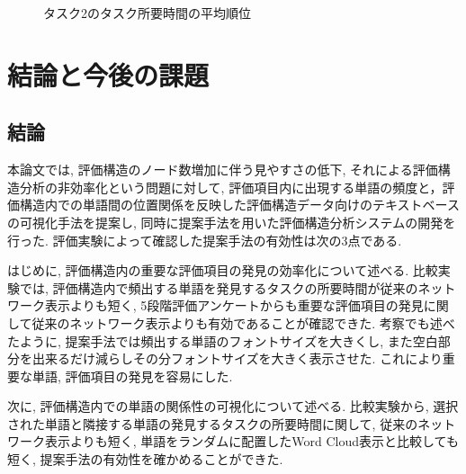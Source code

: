 \documentclass[syuuron]{kuee}
\begin{document}
		\begin{figure}
			\begin{center}
			\end{center}
			\caption{タスク2のタスク所要時間の平均順位}
	  		\label{fig:res10}
		\end{figure}

\chapter{結論と今後の課題}
	\section{結論}
		本論文では, 評価構造のノード数増加に伴う見やすさの低下, それによる評価構造分析の非効率化という問題に対して, 
		評価項目内に出現する単語の頻度と，評価構造内での単語間の位置関係を反映した評価構造データ向けのテキストベースの可視化手法を提案し, 
		同時に提案手法を用いた評価構造分析システムの開発を行った. 
		評価実験によって確認した提案手法の有効性は次の3点である. 
		
		はじめに, 評価構造内の重要な評価項目の発見の効率化について述べる. 
		比較実験では, 評価構造内で頻出する単語を発見するタスクの所要時間が従来のネットワーク表示よりも短く, 
		5段階評価アンケートからも重要な評価項目の発見に関して従来のネットワーク表示よりも有効であることが確認できた. 
		考察でも述べたように, 提案手法では頻出する単語のフォントサイズを大きくし, また空白部分を出来るだけ減らしその分フォントサイズを大きく表示させた. 
		これにより重要な単語, 評価項目の発見を容易にした. 
		
		次に, 評価構造内での単語の関係性の可視化について述べる. 
		比較実験から, 選択された単語と隣接する単語の発見するタスクの所要時間に関して, 従来のネットワーク表示よりも短く, 
		単語をランダムに配置したWord Cloud表示と比較しても短く, 提案手法の有効性を確かめることができた. 
		
\end{document}
